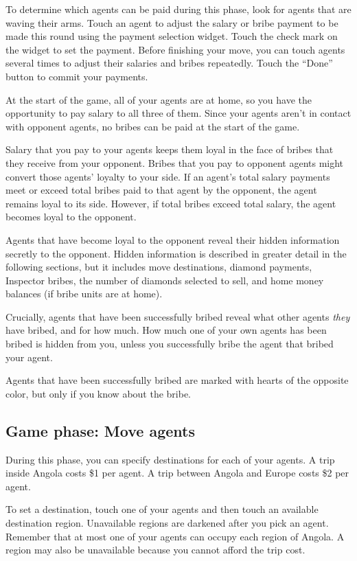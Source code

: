 \documentclass[8pt]{extbook}
\begin{document}
To determine which agents can be paid during this phase, look for agents that are waving their arms.  Touch an agent to adjust the salary or bribe payment to be made this round using the payment selection widget.  Touch the check mark on the widget to set the payment.  Before finishing your move, you can touch agents several times to adjust their salaries and bribes repeatedly.  Touch the ``Done'' button to commit your payments. 

At the start of the game, all of your agents are at home, so you have the opportunity to pay salary to all three of them.  Since your agents aren't in contact with opponent agents, no bribes can be paid at the start of the game.

Salary that you pay to your agents keeps them loyal in the face of bribes that they receive from your opponent.  Bribes that you pay to opponent agents might convert those agents' loyalty to your side.  If an agent's total salary payments meet or exceed total bribes paid to that agent by the opponent, the agent remains loyal to its side.  However, if total bribes exceed total salary, the agent becomes loyal to the opponent.

Agents that have become loyal to the opponent reveal their hidden information secretly to the opponent.  Hidden information is described in greater detail in the following sections, but it includes move destinations, diamond payments, Inspector bribes, the number of diamonds selected to sell, and home money balances (if bribe units are at home).

Crucially, agents that have been successfully bribed reveal what other agents {\it they} have bribed, and for how much.  How much one of your own agents has been bribed is hidden from you, unless you successfully bribe the agent that bribed your agent.

Agents that have been successfully bribed are marked with hearts of the opposite color, but only if you know about the bribe.

\subsection{Game phase:  Move agents}
\label{sec:movePhase}

During this phase, you can specify destinations for each of your agents.  A trip inside Angola costs \$1 per agent.  A trip between Angola and Europe costs \$2 per agent.

To set a destination, touch one of your agents and then touch an available destination region.  Unavailable regions are darkened after you pick an agent.  Remember that at most one of your agents can occupy each region of Angola.  A region may also be unavailable because you cannot afford the trip cost.
\end{document}
